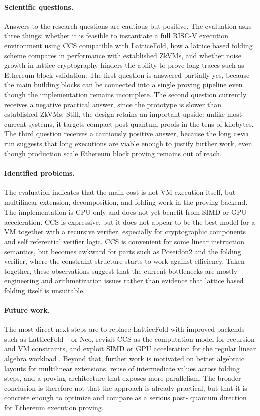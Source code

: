 \documentclass[10pt,a4paper]{article}
\begin{document}
\paragraph{Scientific questions.} Answers to the research
questions are cautious but positive. The evaluation asks three things: whether
it is feasible to instantiate a full RISC-V execution environment using CCS
compatible with LatticeFold, how a lattice based folding scheme compares in
performance with established ZkVMs, and whether noise growth in lattice
cryptography hinders the ability to prove long traces such as Ethereum block
validation. The first question is answered partially yes, because the
main building blocks can be connected into a single proving pipeline even
though the implementation remains incomplete. The second question currently
receives a negative practical answer, since the prototype is slower than
established ZkVMs. Still, the design retains an important upside: unlike most
current systems, it targets compact post-quantum proofs in the tens of
kilobytes. The third question receives a cautiously positive answer, because
the long \texttt{revm} run suggests that long executions are viable enough to
justify further work, even though production scale Ethereum block proving
remains out of reach.

\paragraph{Identified problems.} The evaluation indicates that the main
cost is not VM execution itself, but multilinear extension, decomposition, and
folding work in the proving backend. The implementation is CPU only and does
not yet benefit from SIMD or GPU acceleration. CCS is expressive, but it does
not appear to be the best model for a VM together with a recursive verifier,
especially for cryptographic components and self referential verifier logic.
CCS is convenient for some linear instruction
semantics, but becomes awkward for parts such as Poseidon2 and the folding
verifier, where the constraint structure starts to work against efficiency.
Taken together, these observations suggest that the current bottlenecks are
mostly engineering and arithmetization issues rather than evidence that
lattice based folding itself is unsuitable.

\paragraph{Future work.} The most direct next steps are to replace
LatticeFold with improved backends such as LatticeFold+ or Neo, revisit CCS as
the computation model for recursion and VM constraints, and exploit SIMD or GPU
acceleration for the regular linear algebra workload
\cite{latticefoldplus,neo}. Beyond that, further work is motivated on better
algebraic layouts for multilinear extensions, reuse of intermediate values
across folding steps, and a proving architecture that exposes more parallelism.
The broader conclusion is therefore not that the approach is already practical,
but that it is concrete enough to optimize and compare as a serious post-
quantum direction for Ethereum execution proving.
\end{document}

